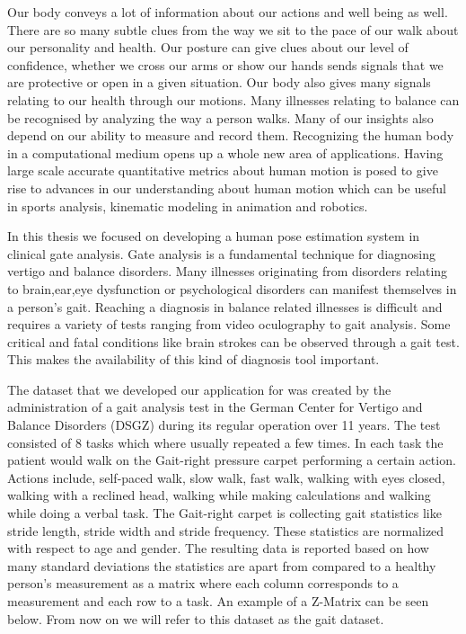 Our body conveys a lot of information about our actions and well being as well. There are so many subtle  clues from the way we sit to the pace of our walk about our personality and health. Our posture can give clues about our level of confidence, whether we cross our arms or show our hands sends signals that we are protective or open in a given situation. Our body also gives many signals relating to our health through our motions. Many illnesses relating to balance can be recognised by analyzing the way a person walks. Many of our insights also depend on our ability to measure and record them. Recognizing the human body in a computational medium opens up a whole new area of applications. Having large scale accurate quantitative metrics about human motion is posed to give rise to advances in our understanding about human motion which can be useful in sports analysis, kinematic modeling in animation and robotics. 

In this thesis we focused on developing a human pose estimation system in clinical gate analysis. Gate analysis is a fundamental technique for diagnosing vertigo and balance disorders. Many illnesses originating from disorders relating to brain,ear,eye dysfunction or psychological disorders can manifest themselves in a person's gait. Reaching a diagnosis in balance related illnesses is difficult and requires a variety of tests ranging from video oculography to gait analysis. Some critical and fatal conditions like brain strokes can be observed through a gait test. This makes the availability of this kind of diagnosis tool important.

The dataset that we developed our application for was created by the administration of a gait analysis test in the German Center for Vertigo and Balance Disorders (DSGZ) during its regular operation over 11 years. The test consisted of 8 tasks which where usually repeated a few times. In each task the patient would walk on the Gait-right pressure carpet performing a certain action. Actions include, self-paced walk, slow walk, fast walk, walking with eyes closed, walking with a reclined head, walking while making calculations and walking while doing a verbal task. The Gait-right carpet is collecting gait statistics like stride length, stride width and stride frequency. These statistics are normalized with respect to age and gender. The resulting data is reported based on how many standard deviations the statistics are apart from compared to a healthy person's measurement as a matrix where each column corresponds to a measurement and each row to a task. An example of a Z-Matrix can be seen below. From now on we will refer to this dataset as the gait dataset.

